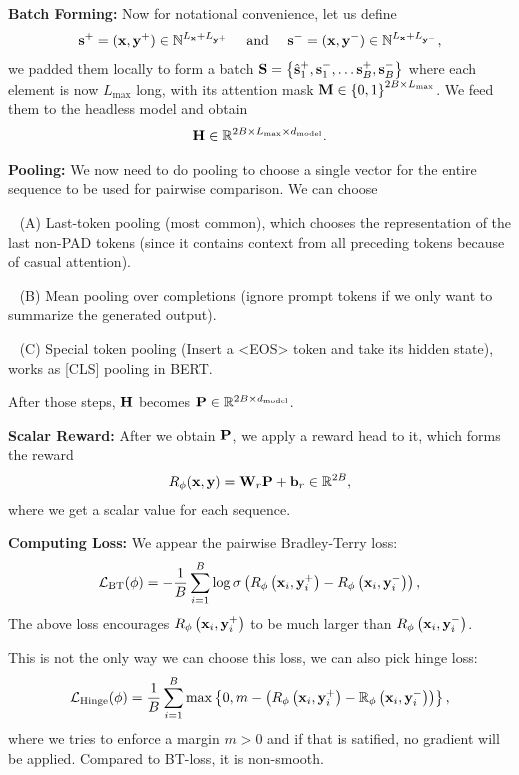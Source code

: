 \documentclass[11pt]{article}  %
\begin{document}
\textbf{Batch Forming:} Now for notational convenience, let us define 
\begin{align*}
  \mathbf{s}^+ = (\mathbf{x}, \mathbf{y}^+) \in \mathbb{N}^{L_{\mathbf{x}} + L_{\mathbf{y}^+}} \quad \text{ and } \quad \mathbf{s}^- = (\mathbf{x}, \mathbf{y}^-) \in \mathbb{N}^{L_{\mathbf{x}} + L_{\mathbf{y}^-}},
\end{align*}
we padded them locally to form a batch $\mathbf{S} = \left\{ \hat{\mathbf{s}}_1^+, {\mathbf{s}}_1^-, \hdots {\mathbf{s}}_B^+, {\mathbf{s}}_B^- \right\}$ where each element is now $L_{\max}$ long, with its attention mask $\mathbf{M} \in \left\{ 0, 1 \right\}^{2B \times L_{\max}}$.
We feed them to the headless model and obtain 
\begin{align*}
  \mathbf{H} \in \mathbb{R}^{2B \times L_{\max} \times d_{\text{model}}}.
\end{align*}

\textbf{Pooling:} We now need to do pooling to choose a single vector for the entire sequence to be used for pairwise comparison. 
We can choose 

\textbullet~ (A) Last-token pooling (most common), which chooses the representation of the last non-PAD tokens (since it contains context from all preceding tokens because of casual attention). 

\textbullet~ (B) Mean pooling over completions (ignore prompt tokens if we only want to summarize the generated output).

\textbullet~ (C) Special token pooling (Insert a <EOS> token and take its hidden state), works as [CLS] pooling in BERT.

After those steps, $\mathbf{H}$ becomes $\mathbf{P} \in \mathbb{R}^{2B \times d_{\text{model}}}$.

\textbf{Scalar Reward:} After we obtain $\mathbf{P}$, we apply a reward head to it, which forms the reward 
\begin{align*}
  R_{\phi}(\mathbf{x}, \mathbf{y}) = \mathbf{W}_r \mathbf{P} + \mathbf{b}_r \in \mathbb{R}^{2B},
\end{align*}
where we get a scalar value for each sequence.

\textbf{Computing Loss:} We appear the pairwise Bradley-Terry loss: 
\begin{align*}
  \mathcal{L}_{\text{BT}}(\phi) = -\frac{1}{B}\sum_{i=1}^{B}\log \sigma\left( R_{\phi}\left( \mathbf{x}_i, \mathbf{y}_i^+ \right) - R_\phi\left( \mathbf{x}_i, \mathbf{y}_i^- \right) \right),
\end{align*}
The above loss encourages $R_{\phi}\left( \mathbf{x}_i, \mathbf{y}_i^+ \right)$ to be much larger than $R_{\phi}\left( \mathbf{x}_i, \mathbf{y}_i^- \right)$.

This is not the only way we can choose this loss, we can also pick hinge loss:
\begin{align*}
  \mathcal{L}_{\text{Hinge}}(\phi) = \frac{1}{B}\sum_{i=1}^{B} \max\left\{ 0, m - \left( R_{\phi}\left( \mathbf{x}_i, \mathbf{y}_i^+ \right) - \mathbb{R}_\phi\left( \mathbf{x}_i, \mathbf{y}_i^- \right) \right) \right\},
\end{align*}
where we tries to enforce a margin $m > 0$ and if that is satified, no gradient will be applied.
Compared to BT-loss, it is non-smooth.
\end{document}
